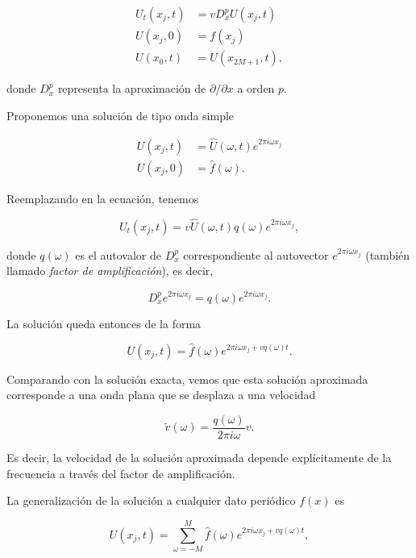\documentclass[12pt]{article}
\begin{document}
\begin{align}
U_t(x_j, t) &= v D_x^p U(x_j, t) \nonumber \\
U(x_j, 0) &= f(x_j) \\
U(x_0,t) &= U(x_{2M+1},t) \nonumber,
\end{align}

donde $D_x^p$ representa la aproximaci\'on de $\partial/\partial x$ a orden $p$.

Proponemos una soluci\'on de tipo onda simple 

\begin{align*}
U(x_j,t) &= \hat{U}(\omega, t) e^{2\pi i \omega x_j} \\
U(x_j, 0) &= \hat{f}(\omega).
\end{align*}

Reemplazando en la ecuaci\'on, tenemos

\begin{equation}
U_t(x_j, t) =  v\hat{U}(\omega, t) q(\omega) e^{2\pi i \omega x_j},
\end{equation}

donde $q(\omega)$ es el autovalor de $D_x^p$ correspondiente al autovector $e^{2\pi i \omega x_j}$ (tambi\'en llamado \emph{factor de amplificaci\'on}), es decir, 

\begin{equation}
D_x^p e^{2\pi i \omega x_j} = q(\omega) e^{2\pi i \omega x_j}.
\end{equation}

La soluci\'on queda entonces de la forma 

\begin{equation}
U(x_j,t) = \hat{f}(\omega) e^{2\pi i \omega x_j + v q(\omega) t}.
\end{equation}

Comparando con la soluci\'on exacta, vemos que esta soluci\'on aproximada corresponde a una onda plana que se desplaza a una velocidad 

\begin{equation}
\tilde{v}(\omega) = \dfrac{q(\omega)}{2\pi i\omega} v.
\end{equation}

Es decir, la velocidad de la soluci\'on aproximada depende expl\'icitamente de la frecuencia a trav\'es del factor de amplificaci\'on.

La generalizaci\'on de la soluci\'on a cualquier dato peri\'odico $f(x)$ es 

\begin{equation}
U(x_j, t) = \sum_{\omega=-M}^M \hat{f}(\omega)  e^{2\pi i \omega x_j + v q(\omega) t},
\end{equation}
\end{document}
